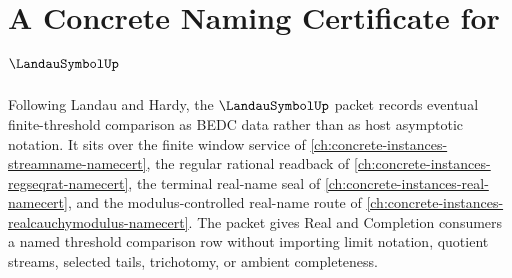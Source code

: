 \chapter{A Concrete Naming Certificate for $\LandauSymbolUp$}
\label{ch:concrete-instances-landau-symbol-namecert}

Following Landau and Hardy, the $\LandauSymbolUp$ packet records eventual finite-threshold comparison as BEDC data rather than as host asymptotic notation. It sits over the finite window service of \autoref{ch:concrete-instances-streamname-namecert}, the regular rational readback of \autoref{ch:concrete-instances-regseqrat-namecert}, the terminal real-name seal of \autoref{ch:concrete-instances-real-namecert}, and the modulus-controlled real-name route of \autoref{ch:concrete-instances-realcauchymodulus-namecert}. The packet gives Real and Completion consumers a named threshold comparison row without importing limit notation, quotient streams, selected tails, trichotomy, or ambient completeness.


